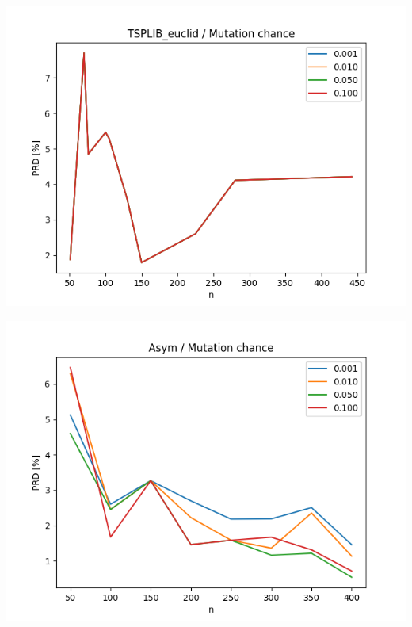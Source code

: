 \documentclass{article}
\begin{document}
\begin{center}
\includegraphics[width=\textwidth, 
                   height = 0.4\textheight, 
                   keepaspectratio]
                  {plots/tsplib_euclid_8_mut_chance} 
\end{center}

\begin{center}
\includegraphics[width=\textwidth, 
                   height = 0.4\textheight, 
                   keepaspectratio]
                  {plots/asym_8_mut_chance} 
\end{center}
\end{document}
